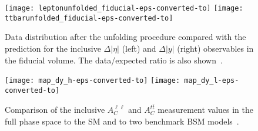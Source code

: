 \documentclass[12pt]{article}
\begin{document}
\begin{figure}[htb]
\centering
\texttt{[image: leptonunfolded\_fiducial-eps-converted-to]}
\texttt{[image: ttbarunfolded\_fiducial-eps-converted-to]}

\caption{Data distribution after the unfolding procedure compared with the prediction for the inclusive $\Delta|\eta|$ (left) and $\Delta|y|$ (right) observables in the fiducial volume. The data/expected ratio is also
shown~\cite{Aad:2016ove}.}
\label{fig:distribution}
\end{figure}


\begin{figure}[htb]
\centering
\texttt{[image: map\_dy\_h-eps-converted-to]}
\texttt{[image: map\_dy\_l-eps-converted-to]}

\caption{Comparison of the inclusive $A_C^{\ell \ell}$ and $A_C^{t\bar{t}}$ measurement values in the full phase space to the SM  and to two benchmark BSM models~\cite{Aad:2016ove}. }
\label{fig:2d}
\end{figure}









 
\end{document}
